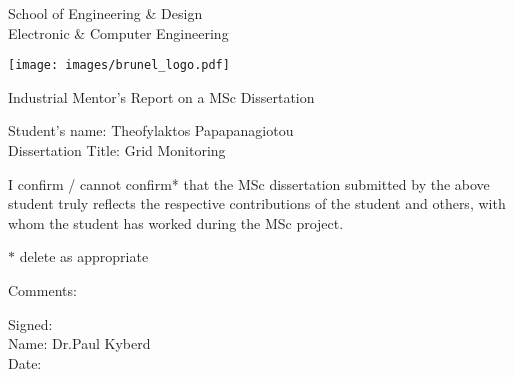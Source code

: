 \newpage
\thispagestyle{empty}
\begin{center}
\Large
School of Engineering \& Design\\
Electronic \& Computer Engineering\\
\vspace{0.5\baselineskip}
\begin{center}
\texttt{[image: images/brunel\_logo.pdf]}\\
\end{center}
\Large
Industrial Mentor's Report on a MSc Dissertation\\
\end{center}
\Large
\vspace{0.5\baselineskip}
Student's name: Theofylaktos Papapanagiotou
\\
Dissertation Title: Grid Monitoring

\vspace{0.5\baselineskip}
\large
\noindent

I confirm / cannot confirm* that the MSc dissertation submitted by the above student
truly reflects the respective contributions of the student and others, with whom the
student has worked during the MSc project.

\vspace{0.5\baselineskip}
$*$ delete as appropriate

\vspace{1\baselineskip}
Comments:


\vspace{2.5\baselineskip}
\noindent
Signed:\\
Name: Dr.Paul Kyberd\\
Date: